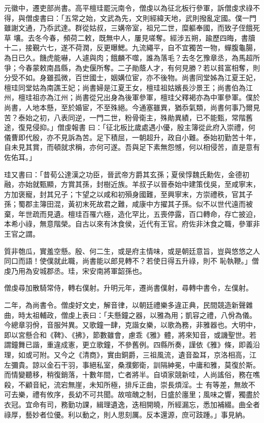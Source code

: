 \begin{pinyinscope}
 元徽中，遷吏部尚書。高平檀珪罷沅南令，僧虔以為征北板行參軍，訴僧虔求祿不得，與僧虔書曰：「五常之始，文武為先，文則經緯天地，武則撥亂定國。僕一門雖謝文通，乃忝武達。群從姑叔，三媾帝室，祖兄二世，糜軀奉國，而致子侄餓死草
 壤。去冬今春，頻荷二敕，既無中人，屢見嗟奪。經涉五朔，踰歷四晦，書牘十二，接覲六七，遂不荷潤，反更曝鰓。九流繩平，自不宜獨苦一物，蟬腹龜腸，為日已久。饑虎能嚇，人遽與肉；餓麟不噬，誰為落毛？去冬乞豫章丞，為馬超所爭；今春蒙敕南昌縣，為史偃所奪。二子勛蔭人才，有何見勝？若以貧富相奪，則分受不如。身雖孤微，百世國士，姻媾位宦，亦不後物。尚書同堂姊為江夏王妃，檀珪同堂姑為南譙王妃；尚書婦是江夏王女，檀珪祖姑嬪長沙景王；尚書伯為江州，檀珪祖亦為江州；尚書從兄出身為後軍參軍，檀珪父釋褐亦為中軍參軍。僕於尚書，人地本懸，至於婚宦，不至殊絕。今通塞雖異，猶忝氣類，尚書何事乃爾見苦？泰始之初，八表同逆，一門二世，粉骨衛主，殊勛異績，已不能甄，常階舊途，復見侵抑。」僧虔報書
 曰：「征北板比歲處遇小優，殷主簿從此府入崇禮，何儀曹即代殷，亦不見訴為苦。足下積屈，一朝超升，政自小難。泰始初勤苦十年，自未見其賞，而頓就求稱，亦何可遂。吾與足下素無怨憾，何以相侵苦，直是意有佐佑耳。」



 珪又書曰：「昔荀公達漢之功臣，晉武帝方爵其玄孫；夏侯惇魏氏勳佐，金德初融，亦始就甄顯，方賞其孫，封樹近族。羊叔子以晉泰始中建策伐吳，至咸寧末，方加褒寵，封其兄子；卞望之以咸和初殞身國難，至興寧末，方崇禮秩，官其子孫；蜀郡主簿田混，黃初末死故君之難，咸康中方擢其子孫。似不以世代遠而被棄，年世疏而見遺。檀珪百罹六極，造化罕比，五喪停露，百口轉命，存亡披迫，本希小祿，無意階榮。自古以來有沐食侯，近代有王官。府佐非沐食之職，參軍非王官之謂。



 質非匏瓜，實羞空懸。殷、何二生，或是府主情味，或是朝廷意旨，豈與悠悠之人同口而語！使僕就此職，尚書能以郎見轉不？若使日得五升祿，則不
 恥執鞭。」僧虔乃用為安城郡丞。珪，宋安南將軍韶孫也。



 僧虔尋加散騎常侍，轉右僕射。升明元年，遷尚書僕射，尋轉中書令，左僕射。



 二年，為尚書令。僧虔好文史，解音律，以朝廷禮樂多違正典，民間競造新聲雜曲，時太祖輔政，僧虔上表曰：「夫懸鐘之器，以雅為用；凱容之禮，八佾為儀。今總章羽佾，音服舛異。又歌鐘一肆，克諧女樂，以歌為務，非雅器也。大明中，即以宮懸合和《鞞》、《拂》，節數雖會，慮乖《雅》體，將來知音，或譏聖世。若謂鐘舞已諧，重違成憲，更立歌鐘，不參舊例。四縣所奏，謹依《雅》條，即義沿理，如或可附。又今之《清商》，實由銅爵，三祖風流，遺音盈耳，京洛相高，江左彌貴。諒以金石干羽，事絕私室，桑濮鄭衛，訓隔紳冕，中庸和雅，莫復於斯。而情變聽移，稍復銷落，十數年間，亡者將半。自頃家競新哇，人尚謠俗，務在噍殺，不顧音紀，流宕無崖，未知所極，排斥正曲，崇長煩淫。士
 有等差，無故不可去樂，禮有攸序，長幼不可共聞。故喧醜之制，日盛於廛里；風味之響，獨盡於衣冠。宜命有司，務勤功課，緝理遺逸，迭相開曉，所經漏忘，悉加補綴。曲全者祿厚，藝妙者位優。利以動之，則人思刻厲。反本還源，庶可跂踵。」事見納。




\end{pinyinscope}
